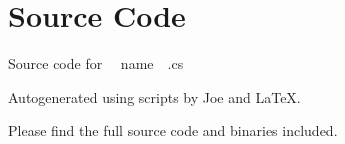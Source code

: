 \documentclass[12pt]{article}
\begin{document}
\maketitle
\pagebreak


\section{Source Code}

Source code for \textsf{~~name~~.cs}


\newpage



\newpage

Autogenerated using scripts by Joe and \LaTeX.

Please find the full source code and binaries included.
\end{document}
